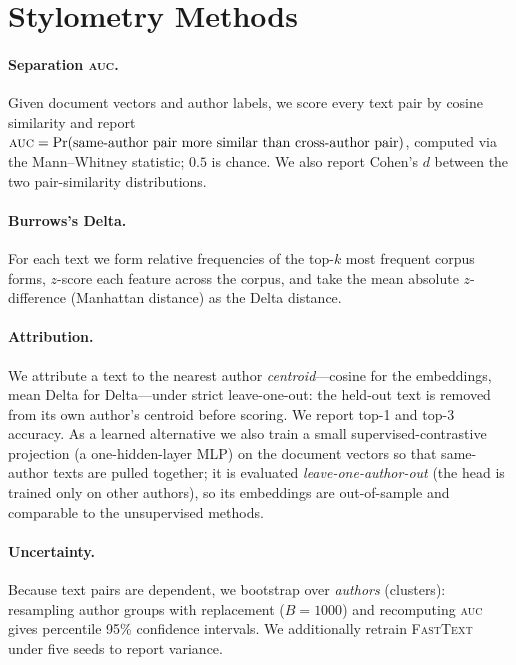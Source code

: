 \documentclass[11pt]{article}
\newcommand{\auc}{\textsc{auc}}
\newcommand{\auc}{\textsc{auc}}
\begin{document}
\section{Stylometry Methods}
\label{sec:methods-style}

\paragraph{Separation \auc{}.}
Given document vectors and author labels, we score every text pair by cosine
similarity and report
$\auc{} = \Pr(\text{same-author pair more similar than cross-author pair})$,
computed via the Mann--Whitney statistic; $0.5$ is chance. We also report
Cohen's $d$ between the two pair-similarity distributions.

\paragraph{Burrows's Delta.}
For each text we form relative frequencies of the top-$k$ most frequent corpus
forms, $z$-score each feature across the corpus, and take the mean absolute
$z$-difference (Manhattan distance) as the Delta distance.

\paragraph{Attribution.}
We attribute a text to the nearest author \emph{centroid}---cosine for the
embeddings, mean Delta for Delta---under strict leave-one-out: the held-out text
is removed from its own author's centroid before scoring. We report top-1 and
top-3 accuracy. As a learned alternative we also train a small
supervised-contrastive projection \citep{khosla2020supcon} (a one-hidden-layer
MLP) on the document vectors so that same-author texts are pulled together; it is
evaluated \emph{leave-one-author-out} (the head is trained only on other
authors), so its embeddings are out-of-sample and comparable to the unsupervised
methods.

\paragraph{Uncertainty.}
Because text pairs are dependent, we bootstrap over \emph{authors} (clusters):
resampling author groups with replacement ($B=1000$) and recomputing \auc{}
gives percentile 95\% confidence intervals. We additionally retrain
\textsc{FastText} under five seeds to report variance.
\end{document}
